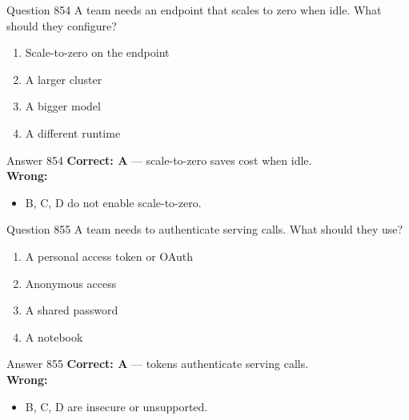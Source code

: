 \documentclass[aspectratio=169,11pt]{beamer}
\begin{document}
	\begin{frame}{Question 854}
		A team needs an endpoint that scales to zero when idle. What should they configure?
		\begin{enumerate}[label=\Alph*.]
			\item Scale-to-zero on the endpoint
			\item A larger cluster
			\item A bigger model
			\item A different runtime
		\end{enumerate}
	\end{frame}
	\begin{frame}{Answer 854}
		\textbf{Correct: A} --- scale-to-zero saves cost when idle.\\
		\vspace{0.5em}
		\textbf{Wrong:}
		\begin{itemize}
			\item B, C, D do not enable scale-to-zero.
		\end{itemize}
	\end{frame}
	
	\begin{frame}{Question 855}
		A team needs to authenticate serving calls. What should they use?
		\begin{enumerate}[label=\Alph*.]
			\item A personal access token or OAuth
			\item Anonymous access
			\item A shared password
			\item A notebook
		\end{enumerate}
	\end{frame}
	\begin{frame}{Answer 855}
		\textbf{Correct: A} --- tokens authenticate serving calls.\\
		\vspace{0.5em}
		\textbf{Wrong:}
		\begin{itemize}
			\item B, C, D are insecure or unsupported.
		\end{itemize}
	\end{frame}
	
\end{document}
